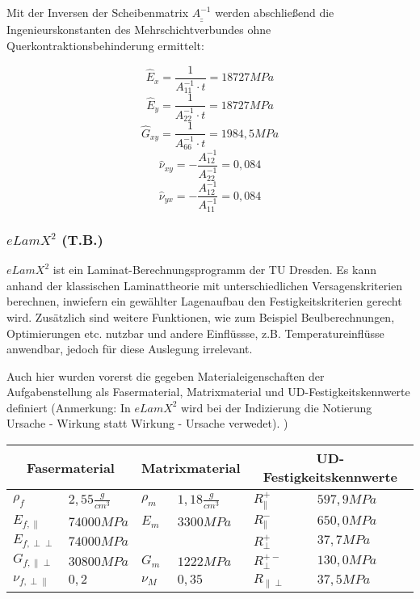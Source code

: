 \noindent Mit der Inversen der Scheibenmatrix $\underline{\underline{A^{-1}}}$ werden abschließend die Ingenieurskonstanten des Mehrschichtverbundes ohne Querkontraktionsbehinderung ermittelt:

\begin{equation}
	\hat{E}_{x}=\frac{1}{A_{11}^{-1}\cdot t} = 18727 MPa
\end{equation}
\begin{equation}
	\hat{E}_{y}=\frac{1}{A_{22}^{-1}\cdot t} = 18727 MPa
\end{equation}
\begin{equation}
	\hat{G}_{xy}=\frac{1}{A_{66}^{-1}\cdot t} = 1984,5 MPa
\end{equation}
\begin{equation}
	\hat{\nu}_{xy}=-\frac{A_{12}^{-1}}{A_{22}^{-1}} = 0,084
\end{equation}
\begin{equation}
	\hat{\nu}_{yx}=-\frac{A_{12}^{-1}}{A_{11}^{-1}} = 0,084
\end{equation}


\subsubsection{$eLamX^{2}$ (T.B.)}\label{elamx}
$eLamX^{2}$ ist ein Laminat-Berechnungsprogramm der TU Dresden. Es kann anhand der klassischen Laminattheorie mit unterschiedlichen Versagenskriterien berechnen, inwiefern ein gewählter Lagenaufbau den Festigkeitskriterien gerecht wird. Zusätzlich sind weitere Funktionen, wie zum Beispiel Beulberechnungen, Optimierungen etc. nutzbar und andere Einflüssse, z.B. Temperatureinflüsse anwendbar, jedoch für diese Auslegung irrelevant.

\noindent Auch hier wurden vorerst die gegeben Materialeigenschaften der Aufgabenstellung als Fasermaterial, Matrixmaterial und  UD-Festigkeitskennwerte definiert (Anmerkung: In $eLamX^{2}$ wird bei der Indizierung die Notierung \glqq Ursache - Wirkung\grqq\: statt \glqq Wirkung - Ursache\grqq\: verwedet). )\\

\begin{tabular}{ll|ll|ll}
	\multicolumn{2}{c}{Fasermaterial} &\multicolumn{2}{c}{Matrixmaterial}  &\multicolumn{2}{c}{UD-Festigkeitskennwerte} \\
	\hline
	$\rho_{f}$ & $2,55 \frac{g}{cm^{3}}$  & $\rho_{m}$ & $1,18 \frac{g}{cm^{3}}$  & $R_{\parallel}^{+}$ & $597,9MPa$ \\
	\hline
	$E_{f,\parallel}$ & $74000MPa$  & $E_{m}$ & $3300MPa$  & $R_{\parallel}^{-}$ & $650,0MPa$\\
	\hline
	$E_{f,\perp\perp}$ & $74000MPa$  &  &   & $R_{\perp}^{+}$ & $37,7MPa$\\
	\hline
	$G_{f,\parallel\perp}$ & $30800MPa$ & $G_{m}$ & $1222MPa$ & $R_{\perp}^{+-}$ & $130,0MPa$\\
	\hline
	$\nu_{f,\perp\parallel}$ & $0,2$  &$\nu_{M}$ &  $0,35$  & $R_{\parallel\perp}$ & $37,5MPa$\\
\end{tabular}\\

